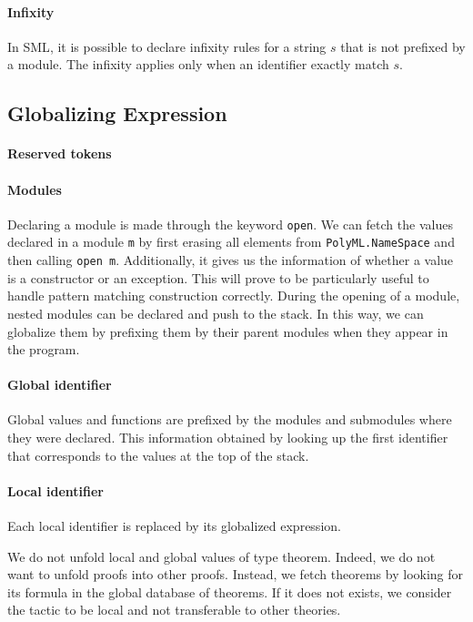 \documentclass[runningheads,a4paper,draft]{svjour3}
\def\sml{\textsf{SML}\xspace}
\begin{document}
\paragraph{Infixity}                                                            
In \sml, it is possible to declare infixity rules for a string $s$ that 
is not prefixed by a module. The infixity applies only when an identifier 
exactly match $s$.                
                                                                                
\subsection{Globalizing Expression}

\paragraph{Reserved tokens}

\paragraph{Modules}
Declaring a module is made through the keyword 
\texttt{open}. We can fetch 
the values declared in a module \texttt{m} by first erasing all elements from 
\texttt{PolyML.NameSpace} and then calling \texttt{open m}. Additionally, it 
gives us the information of whether a value is a constructor or an exception. 
This will prove to be particularly useful to handle pattern matching 
construction correctly. During the opening of a module, nested modules can be 
declared and push to the stack. In this way, we can globalize them by prefixing 
them by their parent modules when they appear in the program.

\paragraph{Global identifier}
Global values and functions are prefixed by the modules and submodules where 
they were declared. This information obtained by looking up the first 
identifier that corresponds to the values at the top of the stack.

\paragraph{Local identifier}
Each local identifier is replaced by its globalized expression.

We do not unfold local and global values of type theorem. Indeed, we do not 
want to 
unfold proofs into other proofs. Instead, we fetch theorems by looking for its 
formula in the global database of 
theorems. If it does not exists, we consider the tactic to be local and not 
transferable to other theories.
\end{document}
